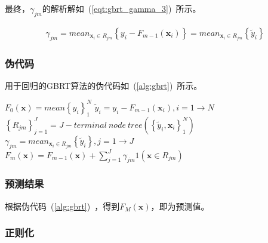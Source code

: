 \documentclass[a4paper,11pt,         %
               ]{article}
\begin{document}
最终，$\gamma _{jm}$的解析解如~(\ref{eqt:gbrt_gamma_3})~所示。

\begin{eqnarray}
  \label{eqt:gbrt_gamma_3}
 \gamma _{jm} = mean_{\mathbf{x}_{i} \in R_{jm}}{\left \{ y_{i} - F_{m - 1}\left ( \mathbf{x}_{i} \right ) \right \}} = mean_{\mathbf{x}_{i} \in R_{jm}}{\left \{ \tilde{y}_{i} \right \}}
\end{eqnarray}

\subsubsection{伪代码}

用于回归的GBRT算法的伪代码如~(\ref{alg:gbrt})~所示。

\begin{algorithm}
  \caption{$LS\_TreeBoost$}
  \label{alg:gbrt}
  \begin{algorithmic}[1] %
  \State $F_{0}\left ( \mathbf{x} \right ) = mean\left \{ y_{i} \right \}_{1}^{N}$
    \State $\tilde{y}_{i}= y_{i}-F_{m-1}\left ( \mathbf{x}_{i} \right ),i = 1 \to N$
    \State $\left \{ R_{jm} \right \}_{j=1}^{J} = J-terminal~node~tree\left ( \left \{ \tilde{y}_{i},\mathbf{x}_{i} \right \}_{1}^{N} \right )$
    \State $ \gamma _{jm} = mean_{\mathbf{x}_{i} \in R_{jm}}{\left \{ \tilde{y}_{i} \right \}}, j = 1 \to J$
    \State $F_{m}\left ( \mathbf{x} \right ) = F_{m-1}\left ( \mathbf{x} \right ) + \sum _{j=1}^{J}{\gamma_{jm}1\left ( \mathbf{x} \in R_{jm}\right ) }$
    \label{alg:gbrt:f_m}
  \EndFor
  \end{algorithmic}
\end{algorithm}

\subsubsection{预测结果}

根据伪代码~(\ref{alg:gbrt})~，得到$F_{M}\left ( \mathbf{x} \right )$，即为预测值。

\subsubsection{正则化}
\end{document}
